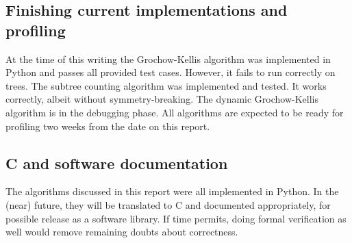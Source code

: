 \documentclass{article}
\begin{document}
\subsection{Finishing current implementations and profiling}
At the time of this writing the Grochow-Kellis algorithm was implemented in Python and passes all provided test cases. However, it fails to run correctly on trees. The subtree counting algorithm was implemented and tested. It works correctly, albeit without symmetry-breaking. The dynamic Grochow-Kellis algorithm is in the debugging phase. All algorithms are expected to be ready for profiling two weeks from the date on this report.

\subsection{C and software documentation}
The algorithms discussed in this report were all implemented in Python. In the (near) future, they will be translated to C and documented appropriately, for possible release as a software library. If time permits, doing formal verification as well would remove remaining doubts about correctness.
\end{document}
